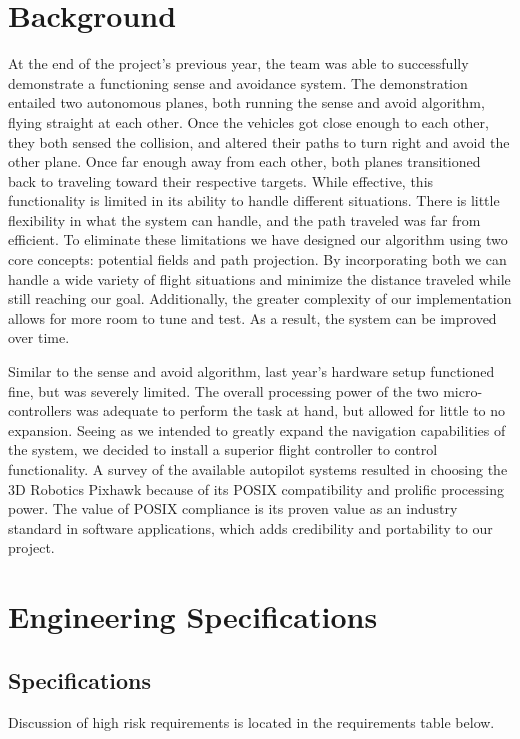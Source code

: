 \documentclass[12pt]{article}
\begin{document}
\section{Background}
At the end of the project's previous year, the team was able to successfully demonstrate a functioning sense and avoidance system. The demonstration entailed two autonomous planes, both running the sense and avoid algorithm, flying straight at each other. Once the vehicles got close enough to each other, they both sensed the collision, and altered their paths to turn right and avoid the other plane. Once far enough away from each other, both planes transitioned back to traveling toward their respective targets. While effective, this functionality is limited in its ability to handle different situations. There is little flexibility in what the system can handle, and the path traveled was far from efficient. To eliminate these limitations we have designed our algorithm using two core concepts: potential fields and path projection. By incorporating both we can handle a wide variety of flight situations and minimize the distance traveled while still reaching our goal. Additionally, the greater complexity of our implementation allows for more room to tune and test. As a result, the system can be improved over time.

Similar to the sense and avoid algorithm, last year's hardware setup functioned fine, but was severely limited. The overall processing power of the two micro-controllers was adequate to perform the task at hand, but allowed for little to no expansion. Seeing as we intended to greatly expand the navigation capabilities of the system, we decided to install a superior flight controller to control functionality. A survey of the available autopilot systems resulted in choosing the 3D Robotics Pixhawk because of its POSIX compatibility and prolific processing power. The value of POSIX compliance is its proven value as an industry standard in software applications, which adds credibility and portability to our project.

\section{Engineering Specifications}
\subsection{Specifications}
Discussion of high risk requirements is located in the requirements table below.
\end{document}

